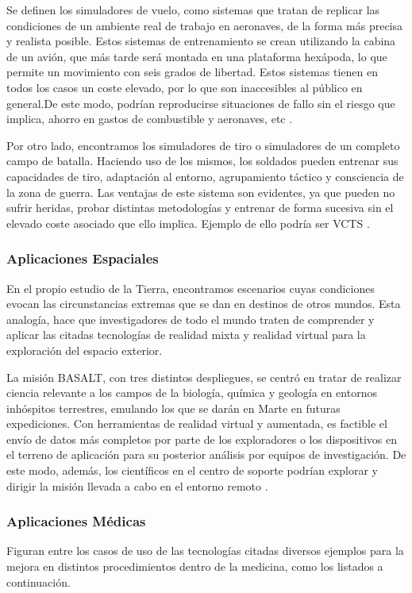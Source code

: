 Se definen los simuladores de vuelo, como sistemas que tratan de replicar las condiciones de un ambiente real de trabajo en aeronaves, de la forma más precisa y realista posible. Estos sistemas de entrenamiento se crean utilizando la cabina de un avión, que más tarde será montada en una plataforma hexápoda, lo que permite un movimiento con seis grados de libertad. Estos sistemas tienen en todos los casos un coste elevado, por lo que son inaccesibles al público en general.De este modo, podrían reproducirse situaciones de fallo sin el riesgo que implica, ahorro en gastos de combustible y aeronaves, etc \cite{25}.

Por otro lado, encontramos los simuladores de tiro o simuladores de un completo campo de batalla. Haciendo uso de los mismos, los soldados pueden entrenar sus capacidades de tiro, adaptación al entorno, agrupamiento táctico y consciencia de la zona de guerra. Las ventajas de este sistema son evidentes, ya que pueden no sufrir heridas, probar distintas metodologías y entrenar de forma sucesiva sin el elevado coste asociado que ello implica. Ejemplo de ello podría ser VCTS \cite{26}.

\subsubsection{Aplicaciones Espaciales}
En el propio estudio de la Tierra, encontramos escenarios cuyas condiciones evocan las circunstancias extremas que se dan en destinos de otros mundos. Esta analogía, hace que investigadores de todo el mundo traten de comprender y aplicar las citadas tecnologías de realidad mixta y realidad virtual para la exploración del espacio exterior.

La misión BASALT, con tres distintos despliegues, se centró en tratar de realizar ciencia relevante a los campos de la biología, química y geología en entornos inhóspitos terrestres, emulando los que se darán en Marte en futuras expediciones. Con herramientas de realidad virtual y aumentada, es factible el envío de datos más completos por parte de los exploradores o los dispositivos en el terreno de aplicación para su posterior análisis por equipos de investigación. De este modo, además, los científicos en el centro de soporte podrían explorar y dirigir la misión llevada a cabo en el entorno remoto \cite{27}.

\subsubsection{Aplicaciones Médicas}
Figuran entre los casos de uso de las tecnologías citadas diversos ejemplos para la mejora en distintos procedimientos dentro de la medicina, como los listados a continuación.  

